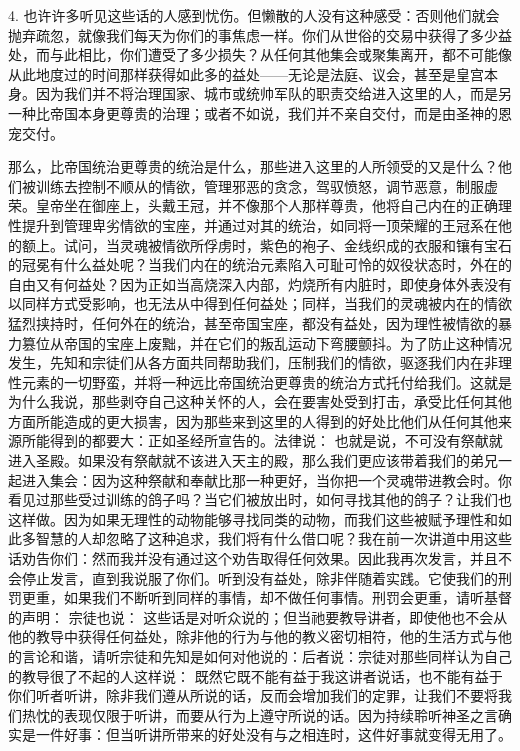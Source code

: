 4. 也许许多听见这些话的人感到忧伤。但懒散的人没有这种感受：否则他们就会抛弃疏忽，就像我们每天为你们的事焦虑一样。你们从世俗的交易中获得了多少益处，而与此相比，你们遭受了多少损失？从任何其他集会或聚集离开，都不可能像从此地度过的时间那样获得如此多的益处——无论是法庭、议会，甚至是皇宫本身。因为我们并不将治理国家、城市或统帅军队的职责交给进入这里的人，而是另一种比帝国本身更尊贵的治理；或者不如说，我们并不亲自交付，而是由圣神的恩宠交付。\par

那么，比帝国统治更尊贵的统治是什么，那些进入这里的人所领受的又是什么？他们被训练去控制不顺从的情欲，管理邪恶的贪念，驾驭愤怒，调节恶意，制服虚荣。皇帝坐在御座上，头戴王冠，并不像那个人那样尊贵，他将自己内在的正确理性提升到管理卑劣情欲的宝座，并通过对其的统治，如同将一顶荣耀的王冠系在他的额上。试问，当灵魂被情欲所俘虏时，紫色的袍子、金线织成的衣服和镶有宝石的冠冕有什么益处呢？当我们内在的统治元素陷入可耻可怜的奴役状态时，外在的自由又有何益处？因为正如当高烧深入内部，灼烧所有内脏时，即使身体外表没有以同样方式受影响，也无法从中得到任何益处；同样，当我们的灵魂被内在的情欲猛烈挟持时，任何外在的统治，甚至帝国宝座，都没有益处，因为理性被情欲的暴力篡位从帝国的宝座上废黜，并在它们的叛乱运动下弯腰颤抖。为了防止这种情况发生，先知和宗徒们从各方面共同帮助我们，压制我们的情欲，驱逐我们内在非理性元素的一切野蛮，并将一种远比帝国统治更尊贵的统治方式托付给我们。这就是为什么我说，那些剥夺自己这种关怀的人，会在要害处受到打击，承受比任何其他方面所能造成的更大损害，因为那些来到这里的人得到的好处比他们从任何其他来源所能得到的都要大：正如圣经所宣告的。法律说： 也就是说，不可没有祭献就进入圣殿。如果没有祭献就不该进入天主的殿，那么我们更应该带着我们的弟兄一起进入集会：因为这种祭献和奉献比那一种更好，当你把一个灵魂带进教会时。你看见过那些受过训练的鸽子吗？当它们被放出时，如何寻找其他的鸽子？让我们也这样做。因为如果无理性的动物能够寻找同类的动物，而我们这些被赋予理性和如此多智慧的人却忽略了这种追求，我们将有什么借口呢？我在前一次讲道中用这些话劝告你们：然而我并没有通过这个劝告取得任何效果。因此我再次发言，并且不会停止发言，直到我说服了你们。听到没有益处，除非伴随着实践。它使我们的刑罚更重，如果我们不断听到同样的事情，却不做任何事情。刑罚会更重，请听基督的声明： 宗徒也说： 这些话是对听众说的；但当祂要教导讲者，即使他也不会从他的教导中获得任何益处，除非他的行为与他的教义密切相符，他的生活方式与他的言论和谐，请听宗徒和先知是如何对他说的：后者说：宗徒对那些同样认为自己的教导很了不起的人这样说： 既然它既不能有益于我这讲者说话，也不能有益于你们听者听讲，除非我们遵从所说的话，反而会增加我们的定罪，让我们不要将我们热忱的表现仅限于听讲，而要从行为上遵守所说的话。因为持续聆听神圣之言确实是一件好事：但当听讲所带来的好处没有与之相连时，这件好事就变得无用了。\par

